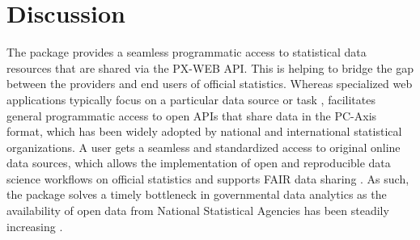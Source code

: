 \section[summary]{Discussion}




The  package provides a seamless programmatic access to
statistical data resources that are shared via the PX-WEB API. This is
helping to bridge the gap between the providers and end users of
official statistics. Whereas specialized web applications typically
focus on a particular data source or task \cite{xxx}, 
facilitates general programmatic access to open APIs that share data
in the PC-Axis format, which has been widely adopted by national and
international statistical organizations. A user gets a seamless and
standardized access to original online data sources, which allows the
implementation of open and reproducible data science workflows on
official statistics \citep{Gandrud13, Boettiger2015} and supports FAIR
data sharing \cite{xxx}. As such, the package solves a timely
bottleneck in governmental data analytics as the availability of open
data from National Statistical Agencies has been steadily increasing
\cite{xxx}.


